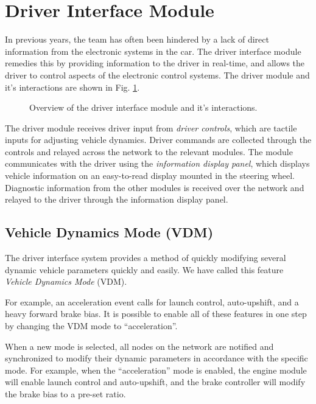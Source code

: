 \section{Driver Interface Module\label{sec:Driver-Interface-Module}}

In previous years, the team has often been hindered by a lack of direct information from the electronic systems in the car. The driver interface module remedies this by providing information to the driver in real-time, and allows the driver to control aspects of the electronic control systems. The driver module and it's interactions are shown in Fig. \ref{fig:design_interface_overview_block}.

\begin{figure}[H]
	\centering
%	
	\caption{Overview of the driver interface module and it's interactions.}
	\label{fig:design_interface_overview_block}
\end{figure}

The driver module receives driver input from \emph{driver controls}, which are tactile inputs for adjusting vehicle dynamics. Driver commands are collected through the controls and relayed across the network to the relevant modules. The module communicates with the driver using the \emph{information display panel}, which displays vehicle information on an easy-to-read display mounted in the steering wheel. Diagnostic information from the other modules is received over the network and relayed to the driver through the information display panel. 

\subsection{Vehicle Dynamics Mode (VDM)}

The driver interface system provides a method of quickly modifying several dynamic vehicle parameters quickly and easily. We have called this feature \emph{Vehicle Dynamics Mode} (VDM). 

For example, an acceleration event calls for launch control, auto-upshift, and a heavy forward brake bias. It is possible to enable all of these features in one step by changing the VDM mode to {}``acceleration''. 

When a new mode is selected, all nodes on the network are notified and synchronized to modify their dynamic parameters in accordance with the specific mode. For example, when the  {}``acceleration'' mode is enabled, the engine module will enable launch control and auto-upshift, and the brake controller will modify the brake bias to a pre-set ratio.

